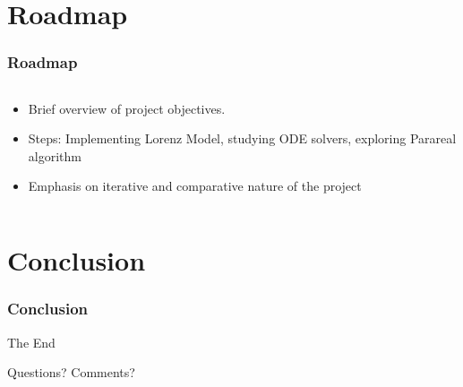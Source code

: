\documentclass[
	11pt,
]{beamer}
\begin{document}
\section{Roadmap}
\begin{frame}
    \frametitle{Roadmap}
	\begin{columns}[c]
		\begin{column}{\textwidth}
			\begin{itemize}
				\item Brief overview of project objectives.
				\item Steps: Implementing Lorenz Model, studying ODE solvers, exploring Parareal algorithm
				\item Emphasis on iterative and comparative nature of the project
			\end{itemize}
		\end{column}
	\end{columns}
\end{frame}


\section{Conclusion}

\begin{frame}
	\frametitle{Conclusion}
	\begin{center}
		{\Huge The End}

		\bigskip\bigskip

		{\LARGE Questions? Comments?}
	\end{center}
\end{frame}

\end{document}
